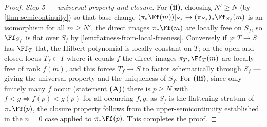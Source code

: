 \begin{proof}
  \emph{Step 5 — universal property and closure.} For \textbf{(ii)}, choosing
  \(N'\ge N\) (by \cref{thm:semicontinuity}) so that base change
  \((\pi_*\Ff(m))|_{S_f}\to(\pi_{S_f})_*\Ff_{S_f}(m)\) is an isomorphism for all
  \(m\ge N'\), the direct images \(\pi_*\Ff(m)\) are locally free on \(S_f\), so
  \(\Ff_{S_f}\) is flat over \(S_f\) by \cref{lem:flatness-from-local-freeness}.
  Conversely if \(\varphi:T\to S\) has \(\Ff_T\) flat, the Hilbert polynomial is
  locally constant on \(T\); on the open-and-closed locus \(T_f\subset T\) where
  it equals \(f\) the direct images \({\pi_T}_*\Ff_T(m)\) are locally free of rank
  \(f(m)\), and this forces \(T_f\to S\) to factor schematically through
  \(S_f\) — giving the universal property and the uniqueness of \(S_f\). For
  \textbf{(iii)}, since only finitely many \(f\) occur (statement \textbf{(A)})
  there is \(p\ge N\) with \(f<g\iff f(p)<g(p)\) for all occurring \(f,g\); as
  \(S_f\) is the flattening stratum of \(\pi_*\Ff(p)\), the closure property
  follows from the upper-semicontinuity established in the \(n=0\) case applied to
  \(\pi_*\Ff(p)\). This completes the proof.
\end{proof}
